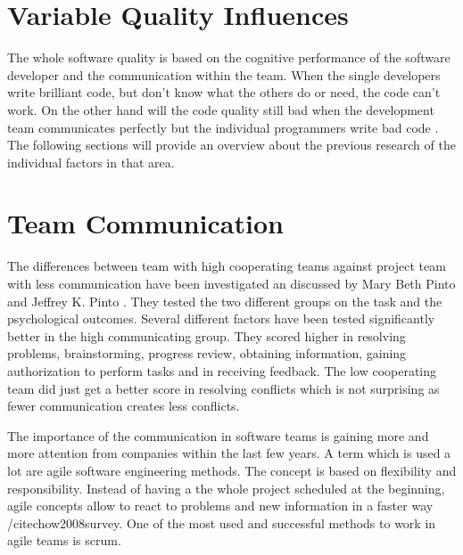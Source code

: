 \section{Variable Quality Influences}
The whole software quality is based on the cognitive performance of the software developer and the communication within the team. 
When the single developers write brilliant code, but don't know what the others do or need, the code can't work. On the other hand will the code quality still bad when the development team communicates perfectly but the individual programmers write bad code \cite{moe2010teamwork}. The following sections will provide an overview about the previous research of the individual factors in that area. 

\section{Team Communication}
The differences between team with high cooperating teams against project team with less communication have been investigated an discussed by Mary Beth Pinto and Jeffrey K. Pinto \cite{pinto1990project}. They tested the two different groups on the task and the psychological outcomes. Several different factors have been tested significantly better in the high communicating group. They scored higher in resolving problems, brainstorming, progress review, obtaining information, gaining authorization to perform tasks and in receiving feedback. The low cooperating team did just get a better score in resolving conflicts which is not surprising as fewer communication creates less conflicts. 

The importance of the communication in software teams is gaining more and more attention from companies within the last few years. A term which is used a lot are agile software engineering methods. The concept is based on flexibility and responsibility. Instead of having a the whole project scheduled at the beginning, agile concepts allow to react to problems and new information in a faster way /cite{chow2008survey}. One of the most used and successful methods to work in agile teams is scrum.

